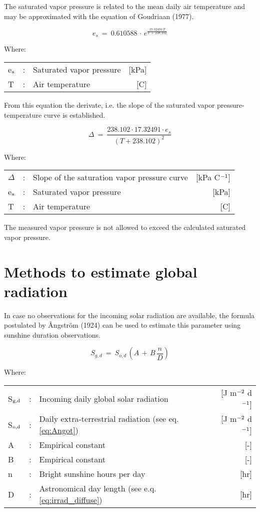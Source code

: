 The saturated vapor pressure is related to the mean daily air temperature and may be
approxi\-mated with the equation of Goudriaan (1977). 

\begin{equation}
\label{eq:SVP}
e_{s} ~=~ 0.610588\, \cdot \, e ^{{\frac{17.32491\, T}{T\, +\, 238.102}} }
\end{equation}

Where:\\[5pt]
\begin{tabularx}{\textwidth}{llXr}
	e$_{{\rm s}}$ &:& Saturated vapor pressure  & [kPa]\\
	T &:& Air temperature & [\textdegree C]
\end{tabularx}

From this equation the derivate, i.e. the slope of the saturated vapor pressure-temperature
curve is established.

\begin{equation}
\label{eq:SlopeSVP}
\Delta ~=~{\frac{238.102 \cdot 17.32491 \cdot e_{s} }{(T + 238.102)^{2} }}
\end{equation}

Where:\\[5pt]
\begin{tabularx}{\textwidth}{llXr}
	$\Delta$ &:& Slope of the saturation vapor pressure curve  & [kPa \textdegree C$^{{\rm -1}}$]\\
	e$_{{\rm s}}$ &:& Saturated vapor pressure &  [kPa]\\
	T &:& Air temperature & [\textdegree C]
\end{tabularx}

The measured vapor pressure is not allowed to exceed the calculated saturated vapor
pressure.

\section{Methods to estimate global radiation}

In case no observations for the incoming solar radiation are available, the formula
postulated by \AA ngstr\"{o}m (1924) can be used to estimate this parameter using sunshine
duration observations.

\begin{equation}
\label{eq:GlobRad}
S _{g,d} ~=~S _{o,d} \, (A\, +\, B\,{\frac{n}{D}} )
\end{equation}

Where:\\[5pt]
\begin{tabularx}{\textwidth}{llXr}
	S$_{{\rm g,d}}$ &:& Incoming daily global solar radiation  & [J m$^{{\rm -2}}$ d$^{{\rm -1}}$]\\
	S$_{{\rm o,d}}$ &:& Daily extra-terrestrial radiation (see eq. \ref{eq:Angot}) 
	& [J m$^{{\rm -2}}$ d$^{{\rm -1}}$]\\
	A &:& Empirical constant  & [-]\\
	B &:& Empirical constant  & [-]\\
	n &:& Bright sunshine hours per day  & [hr]\\
	D &:& Astronomical day length (see e.q. \ref{eq:irrad_diffuse})  & [hr]
\end{tabularx}

